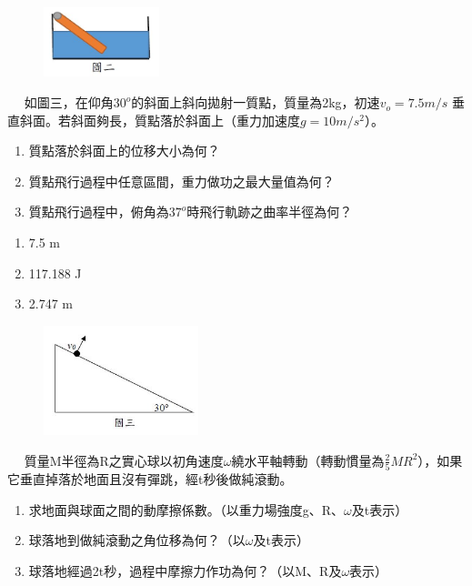 \documentclass[cn,10pt,math=newtx,chinesefont=founder]{elegantbook}
\begin{document}
\begin{figure}[htbp]
\flushright
\includegraphics[width=0.3\textwidth]{image/22.JPG}
\end{figure}

\newpage


\begin{example}　
    如圖三，在仰角$30^o$的斜面上斜向拋射一質點，質量為2kg，初速$v_o=7.5m/s$ 垂直斜面。若斜面夠長，質點落於斜面上（重力加速度$g=10m/s^2$）。
    \begin{enumerate}[label=(\arabic*)]
    \item 質點落於斜面上的位移大小為何？
    \item 質點飛行過程中任意區間，重力做功之最大量值為何？
    \item 質點飛行過程中，俯角為$37^o$時飛行軌跡之曲率半徑為何？
    \end{enumerate}
    
    \rightline{[3]}
\end{example}

\begin{solution}
\begin{enumerate}[label=(\arabic*)]
\item 7.5 m
\item 117.188 J
\item 2.747 m
\end{enumerate}
\end{solution}

\begin{figure}[htbp]
\flushright
\includegraphics[width=0.4\textwidth]{image/33.JPG}
\end{figure}

\newpage


\begin{example}　
    質量M半徑為R之實心球以初角速度$\omega$繞水平軸轉動（轉動慣量為$\frac{2}{5}MR^2$），如果它垂直掉落於地面且沒有彈跳，經t秒後做純滾動。
    \begin{enumerate}[label=(\arabic*)]
    \item 求地面與球面之間的動摩擦係數。（以重力場強度g、R、$\omega$及t表示）
    \item 球落地到做純滾動之角位移為何？（以$\omega$及t表示）
    \item 球落地經過2t秒，過程中摩擦力作功為何？（以M、R及$\omega$表示）
    \end{enumerate}
    
    \rightline{[4]}
\end{example}
\end{document}
